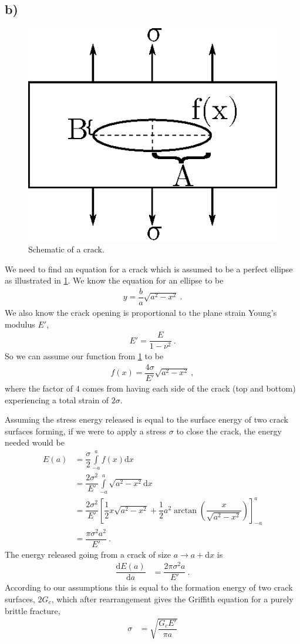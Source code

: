 \documentclass[a4paper]{article}
\begin{document}
	\subsection{b)}
	\begin{figure}
		\centering
		\includegraphics[width=0.33\linewidth]{griffderv.eps}
		\caption{Schematic of a crack.}
		\label{f:griffderv}
	\end{figure}
	We need to find an equation for a crack which is assumed to be a perfect ellipse as illustrated in \cref{f:griffderv}. We know the equation for an ellipse to be
	\begin{align}
		y = \dfrac{b}{a} \sqrt{a^{2} - x^{2}}~.
	\end{align}
	We also know the crack opening is proportional to the plane strain Young's modulus $E'$,
	\begin{align}
		E' = \dfrac{E}{1-\nu^{2}}~.
	\end{align}
	So we can assume our function from \cref{f:griffderv} to be
	\begin{align}
		f(x) = \dfrac{4 \sigma}{E'} \sqrt{a^{2} - x^{2}}~,
	\end{align}
	where the factor of $4$ comes from having each side of the crack (top and bottom) experiencing a total strain of $2 \sigma$.
	
	Assuming the stress energy released is equal to the surface energy of two crack surfaces forming, if we were to apply a stress $\sigma$ to close the crack, the energy needed would be
	\begin{subequations}
	\begin{align}
		E(a) &= \dfrac{\sigma}{2} \int\limits_{-a}^{a} f(x) \mathrm{d}x \\
			 &= \dfrac{2 \sigma^{2}}{E'} \int\limits_{-a}^{a} \sqrt{a^{2} - x^{2}} \mathrm{d}x \\
			 &= \dfrac{2 \sigma^{2}}{E'} \left[ \dfrac{1}{2} x \sqrt{a^{2} - x^{2}} + \dfrac{1}{2} a^{2} \arctan\left(\dfrac{x}{\sqrt{a^{2} - x^{2}}}\right) \right]_{-a}^{a}\\
			 &= \dfrac{\pi \sigma^{2} a^{2}}{E'}~.
	\end{align}
	\end{subequations}
	The energy released going from a crack of size $a \to a + \mathrm{d}x$ is
	\begin{align}
		\dfrac{\mathrm{d}E(a)}{\mathrm{d}a} &= \dfrac{2 \pi \sigma^{2} a}{E'}~.
	\end{align}
	According to our assumptions this is equal to the formation energy of two crack surfaces, $2G_{c}$, which after rearrangement gives the Griffith equation for a purely brittle fracture,
	\begin{align}
		\sigma &= \sqrt{\dfrac{G_{c} E'}{\pi a}}
	\end{align}
\end{document}
